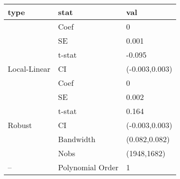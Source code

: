 
\begin{tabular}{lll}
\toprule
type & stat & val\\
\midrule
 & Coef & 0\\

 & SE & 0.001\\

 & t-stat & -0.095\\

\multirow{-4}{*}{\raggedright\arraybackslash Local-Linear} & CI & (-0.003,0.003)\\
\cmidrule{1-3}
 & Coef & 0\\

 & SE & 0.002\\

 & t-stat & 0.164\\

\multirow{-4}{*}{\raggedright\arraybackslash Robust} & CI & (-0.003,0.003)\\
\cmidrule{1-3}
 & Bandwidth & (0.082,0.082)\\

 & Nobs & (1948,1682)\\

\multirow{-3}{*}{\raggedright\arraybackslash --} & Polynomial Order & 1\\
\bottomrule
\end{tabular}